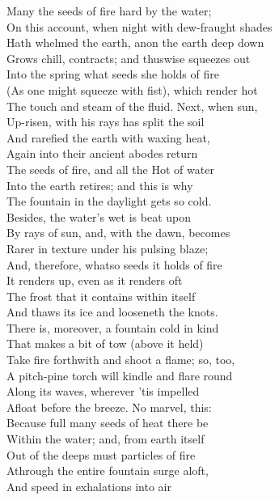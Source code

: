 Many the seeds of fire hard by the water;\\
On this account, when night with dew-fraught shades\\
Hath whelmed the earth, anon the earth deep down\\
Grows chill, contracts; and thuswise squeezes out\\
Into the spring what seeds she holds of fire\\
(As one might squeeze with fist), which render hot\\
The touch and steam of the fluid. Next, when sun,\\
Up-risen, with his rays has split the soil\\
And rarefied the earth with waxing heat,\\
Again into their ancient abodes return\\
The seeds of fire, and all the Hot of water\\
Into the earth retires; and this is why\\
The fountain in the daylight gets so cold.\\
Besides, the water's wet is beat upon\\
By rays of sun, and, with the dawn, becomes\\
Rarer in texture under his pulsing blaze;\\
And, therefore, whatso seeds it holds of fire\\
It renders up, even as it renders oft\\
The frost that it contains within itself\\
And thaws its ice and looseneth the knots.\\
There is, moreover, a fountain cold in kind\\
That makes a bit of tow (above it held)\\
Take fire forthwith and shoot a flame; so, too,\\
A pitch-pine torch will kindle and flare round\\
Along its waves, wherever 'tis impelled\\
Afloat before the breeze. No marvel, this:\\
Because full many seeds of heat there be\\
Within the water; and, from earth itself\\
Out of the deeps must particles of fire\\
Athrough the entire fountain surge aloft,\\
And speed in exhalations into air\\
